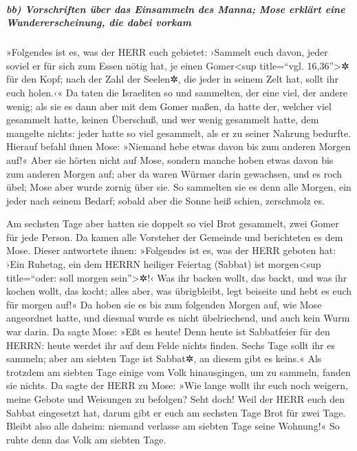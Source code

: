 \hypertarget{bb-vorschriften-uxfcber-das-einsammeln-des-manna-mose-erkluxe4rt-eine-wundererscheinung-die-dabei-vorkam}{%
\subparagraph{bb) Vorschriften über das Einsammeln des Manna; Mose
erklärt eine Wundererscheinung, die dabei
vorkam}\label{bb-vorschriften-uxfcber-das-einsammeln-des-manna-mose-erkluxe4rt-eine-wundererscheinung-die-dabei-vorkam}}

 »Folgendes ist es, was der HERR euch gebietet: ›Sammelt
euch davon, jeder soviel er für sich zum Essen nötig hat, je einen
Gomer\textless sup title=``vgl. 16,36''\textgreater✲ für den Kopf; nach
der Zahl der Seelen✲, die jeder in seinem Zelt hat, sollt ihr euch
holen.‹«  Da taten die Israeliten so und sammelten, der
eine viel, der andere wenig;  als sie es dann aber mit
dem Gomer maßen, da hatte der, welcher viel gesammelt hatte, keinen
Überschuß, und wer wenig gesammelt hatte, dem mangelte nichts: jeder
hatte so viel gesammelt, als er zu seiner Nahrung bedurfte.
 Hierauf befahl ihnen Mose: »Niemand hebe etwas davon bis
zum anderen Morgen auf!«  Aber sie hörten nicht auf Mose,
sondern manche hoben etwas davon bis zum anderen Morgen auf; aber da
waren Würmer darin gewachsen, und es roch übel; Mose aber wurde zornig
über sie.  So sammelten sie es denn alle Morgen, ein
jeder nach seinem Bedarf; sobald aber die Sonne heiß schien, zerschmolz
es.

 Am sechsten Tage aber hatten sie doppelt so viel Brot
gesammelt, zwei Gomer für jede Person. Da kamen alle Vorsteher der
Gemeinde und berichteten es dem Mose.  Dieser antwortete
ihnen: »Folgendes ist es, was der HERR geboten hat: ›Ein Ruhetag, ein
dem HERRN heiliger Feiertag (Sabbat) ist morgen\textless sup
title=``oder: soll morgen sein''\textgreater✲!‹ Was ihr backen wollt,
das backt, und was ihr kochen wollt, das kocht; alles aber, was
übrigbleibt, legt beiseite und hebt es euch für morgen auf!«
 Da hoben sie es bis zum folgenden Morgen auf, wie Mose
angeordnet hatte, und diesmal wurde es nicht übelriechend, und auch kein
Wurm war darin.  Da sagte Mose: »Eßt es heute! Denn heute
ist Sabbatfeier für den HERRN: heute werdet ihr auf dem Felde nichts
finden.  Sechs Tage sollt ihr es sammeln; aber am siebten
Tage ist Sabbat✲, an diesem gibt es keins.«  Als trotzdem
am siebten Tage einige vom Volk hinausgingen, um zu sammeln, fanden sie
nichts.  Da sagte der HERR zu Mose: »Wie lange wollt ihr
euch noch weigern, meine Gebote und Weisungen zu befolgen?
 Seht doch! Weil der HERR euch den Sabbat eingesetzt hat,
darum gibt er euch am sechsten Tage Brot für zwei Tage. Bleibt also alle
daheim: niemand verlasse am siebten Tage seine Wohnung!« 
So ruhte denn das Volk am siebten Tage.

